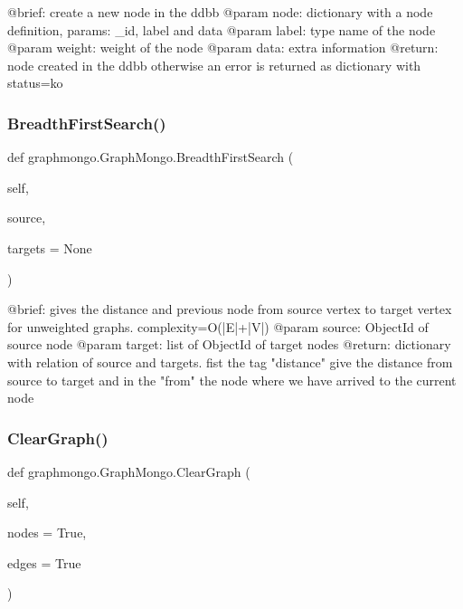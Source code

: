\begin{DoxyVerb}@brief: create a new node in the ddbb
@param node: dictionary with a node definition, params: _id, label and data
@param label: type name of the node
@param weight: weight of the node
@param data: extra information
@return: node created in the ddbb otherwise an error is returned as dictionary with status=ko  
\end{DoxyVerb}
 \hypertarget{classgraphmongo_1_1GraphMongo_a83f03c06d846ba61ba414a501825cdba}{}\label{classgraphmongo_1_1GraphMongo_a83f03c06d846ba61ba414a501825cdba} 
\subsubsection{\texorpdfstring{Breadth\+First\+Search()}{BreadthFirstSearch()}}
{\footnotesize\ttfamily def graphmongo.\+Graph\+Mongo.\+Breadth\+First\+Search (\begin{DoxyParamCaption}\item[{}]{self,  }\item[{}]{source,  }\item[{}]{targets = {\ttfamily None} }\end{DoxyParamCaption})}

\begin{DoxyVerb}@brief: gives the distance and previous node from source vertex to target vertex for unweighted graphs. complexity=O(|E|+|V|)
@param source: ObjectId of source node
@param target: list of ObjectId of target nodes
@return: dictionary with relation of source and targets. fist the tag "distance" give the distance from source to target and in the "from" the node where we have arrived to the current node
\end{DoxyVerb}
 \hypertarget{classgraphmongo_1_1GraphMongo_a87d7b0d238de463bfffcae1a4ed7683f}{}\label{classgraphmongo_1_1GraphMongo_a87d7b0d238de463bfffcae1a4ed7683f} 
\subsubsection{\texorpdfstring{Clear\+Graph()}{ClearGraph()}}
{\footnotesize\ttfamily def graphmongo.\+Graph\+Mongo.\+Clear\+Graph (\begin{DoxyParamCaption}\item[{}]{self,  }\item[{}]{nodes = {\ttfamily True},  }\item[{}]{edges = {\ttfamily True} }\end{DoxyParamCaption})}


